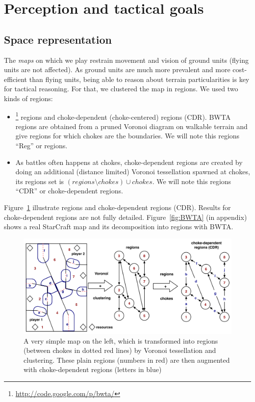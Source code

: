 \section{Perception and tactical goals}
\subsection{Space representation}
The \textit{maps} on which we play restrain movement and vision of ground units (flying units are not affected). As ground units are much more prevalent and more cost-efficient than flying units, being able to reason about terrain particularities is key for tactical reasoning. For that, we clustered the map in regions. 
We used two kinds of regions: 
\begin{itemize}
    \item {}\footnote{\url{http://code.google.com/p/bwta/}} regions and choke-dependent (choke-centered) regions (CDR). BWTA regions are obtained from a pruned Voronoi diagram on walkable terrain \citep{Perkins2010} and give regions for which chokes are the boundaries. We will note this regions ``Reg'' or regions.
    \item As battles often happens at chokes, choke-dependent regions are created by doing an additional (distance limited) Voronoi tessellation spawned at chokes, its regions set is $(regions \setminus chokes) \cup chokes$. We will note this regions ``CDR'' or choke-dependent regions.
\end{itemize}
Figure~\ref{fig:terrainanalysis} illustrate regions and choke-dependent regions (CDR). Results for choke-dependent regions are not fully detailed. Figure~\ref{fig:BWTA} (in appendix) shows a real StarCraft map and its decomposition into regions with BWTA.

\begin{figure}[!h]
\begin{center}
\includegraphics[width=0.99\columnwidth]{images/terrain_analysis.png}
\caption{A very simple map on the left, which is transformed into regions (between chokes in dotted red lines) by Voronoi tessellation and clustering. These plain regions (numbers in red) are then augmented with choke-dependent regions (letters in blue)}%
\label{fig:terrainanalysis}
\end{center}
\end{figure}

